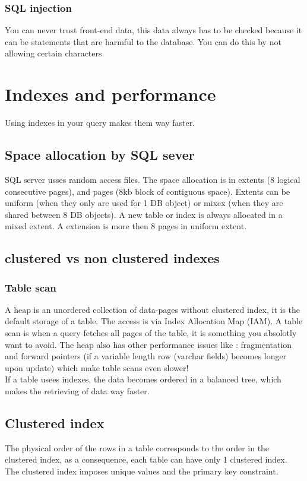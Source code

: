 \documentclass{report}
\begin{document}
			\subsection{SQL injection}
				You can never trust front-end data, this data always has to be checked because it can be statements that are harmful to the database. You can do this by not allowing certain characters. 
	\chapter{Indexes and performance}
		Using indexes in your query makes them way faster. 
		\section{Space allocation by SQL sever}
			SQL server usses random access files. The space allocation is in extents (8 logical consecutive pages), and pages (8kb block of contiguous space). Extents can be uniform (when they only are used for 1 DB object) or mixex (when they are shared between 8 DB objects). A new table or index is always allocated in a mixed extent. A extension is more then 8 pages in uniform extent. 
		\section{clustered vs non clustered indexes}
			\subsection{Table scan}
				A heap is an unordered collection of data-pages without clustered index, it is the default storage of a table. The access is via Index Allocation Map (IAM). A table scan is when a query fetches all pages of the table, it is something you absolotly want to avoid. The heap also has other performance issues like : fragmentation and forward pointers (if a variable length row (varchar fields) becomes longer upon update) which make table scans even slower!
				\\
				If a table usees indexes, the data becomes ordered in a balanced tree, which makes the retrieving of data way faster. 
		\section{Clustered index}
			The physical order of the rows in a table corresponds to the order in the clustered index, as a consequence, each table can have only 1 clustered index. The clustered index imposes unique values and the primary key constraint.
\end{document}
